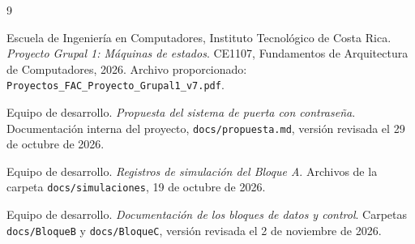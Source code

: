 \documentclass[12pt,letterpaper]{article}
\begin{document}

\begin{thebibliography}{9}

Escuela de Ingeniería en Computadores,
Instituto Tecnológico de Costa Rica.
\textit{Proyecto Grupal 1: Máquinas de estados}.
CE1107, Fundamentos de Arquitectura de Computadores,
2026. Archivo proporcionado:
\texttt{Proyectos\_FAC\_Proyecto\_Grupal1\_v7.pdf}.

Equipo de desarrollo.
\textit{Propuesta del sistema de puerta con contraseña}.
Documentación interna del proyecto,
\texttt{docs/propuesta.md}, versión revisada
el 29 de octubre de 2026.

Equipo de desarrollo.
\textit{Registros de simulación del Bloque A}.
Archivos de la carpeta
\texttt{docs/simulaciones}, 19 de octubre de 2026.

Equipo de desarrollo.
\textit{Documentación de los bloques de datos y control}.
Carpetas \texttt{docs/BloqueB} y
\texttt{docs/BloqueC}, versión revisada
el 2 de noviembre de 2026.

\end{thebibliography}
\end{document}
